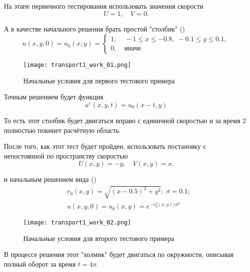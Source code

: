 На этапе первичного тестирования использовать
значения скорости
\begin{equation*}
    U = 1, \quad V = 0.
\end{equation*}

А в качестве начального решения брать простой "столбик" ()
\begin{equation*}
    u(x,y,0) = u_0(x, y) = \begin{cases}
        1, & \; -1\leq x \leq -0.8, \; -0.1 \leq y \leq 0.1, \\
        0, & \; \text{иначе}.
    \end{cases}
\end{equation*}

\begin{figure}[h]
\centering
\texttt{[image: transport1\_work\_01.png]}
\caption{Начальные условия для первого тестового примера}
\label{fig:transport1_work_01}
\end{figure}

Точным решением будет функция
\begin{equation*}
    u^e(x, y, t) = u_0(x-t, y)
\end{equation*}

То есть этот столбик будет двигаться вправо с единичной
скоростью и за время 2 полностью покинет расчётную область.


После того, как этот тест будет пройден,
использовать постановку с непостоянной по пространству скоростью
\begin{equation*}
    U(x, y) = -y, \quad V(x, y) = x.
\end{equation*}

и начальным решением вида ()
\begin{align*}
    &r_0(x, y) = \sqrt{(x - 0.5)^2 + y^2}; \; \sigma = 0.1;\\
    &u(x, y, 0) = u_0(x, y) = e^{-r_0^2(x, y)/\sigma^2}
\end{align*}

\begin{figure}[h]
\centering
\texttt{[image: transport1\_work\_02.png]}
\caption{Начальные условия для второго тестового примера}
\label{fig:transport1_work_02}
\end{figure}

В процессе решения этот "холмик" будет
двигаться по окружности, описывая полный оборот за время $t=4\pi$.

